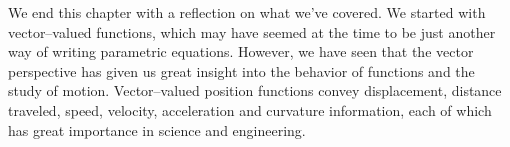 We end this chapter with a reflection on what we've covered. We started with vector--valued functions, which may have seemed at the time to be just another way of writing parametric equations. However, we have seen that the vector perspective has given us great insight into the behavior of functions and the study of motion. Vector--valued position functions convey displacement, distance traveled, speed, velocity, acceleration and curvature information, each of which has great importance in science and engineering.

